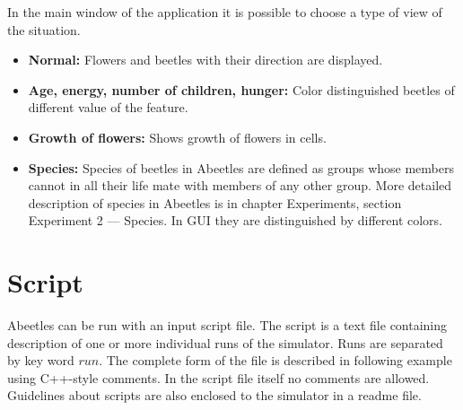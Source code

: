 \documentclass[a4paper,12pt]{report}
\begin{document}
In the main window of the application it is possible to choose a type of view of the situation. 
\begin{itemize}
\item 	\textbf{Normal: } Flowers and beetles with their direction are displayed. 
\item 	\textbf{Age, energy, number of children, hunger: } Color distinguished beetles of different value of the feature.
\item 	\textbf{Growth of flowers: } Shows growth of flowers in cells.
\item 	\textbf{Species: }Species of beetles in Abeetles are defined as groups whose members cannot in all their life mate with members of any other group. More detailed description of species in Abeetles is in chapter Experiments, section Experiment 2 --- Species. In GUI they are distinguished by different colors.
\end{itemize}


\section{Script}

Abeetles can be run with an input script file. The script is a text file containing description of one or more individual runs of the simulator. Runs are separated by key word $run$. The complete form of the file is described in following example using C++-style comments. In the script file itself no comments are allowed. Guidelines about scripts are also enclosed to the simulator in a readme file.

\end{document}
